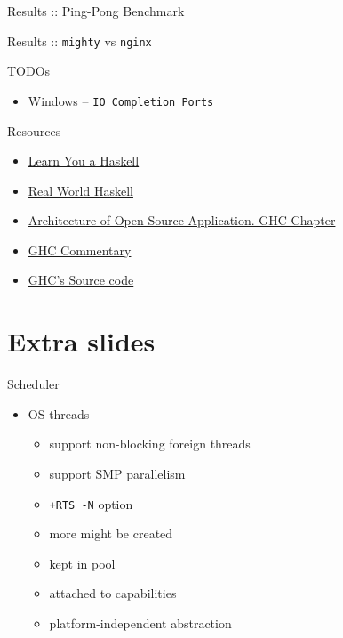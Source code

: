 \documentclass{beamer}
\begin{document}
\begin{frame}{Results :: Ping-Pong Benchmark}
  \centering
\end{frame}

\begin{frame}{Results :: \texttt{mighty} vs \texttt{nginx}}
  \centering
\end{frame}

\begin{frame}{TODOs}
  \begin{itemize}
    \item Windows \pause -- \texttt{IO Completion Ports}
  \end{itemize}
\end{frame}

\begin{frame}{Resources}
  \begin{itemize}
    \item \href{http://learnyouahaskell.com/}{Learn You a Haskell}
    \item \href{http://book.realworldhaskell.org/read/}{Real World Haskell}
    \item \href{http://www.aosabook.org/en/ghc.html}{Architecture of Open Source Application. GHC Chapter}
    \item \href{http://hackage.haskell.org/trac/ghc/wiki/Commentary}{GHC Commentary}
    \item \href{https://github.com/ghc/ghc}{GHC's Source code}
  \end{itemize}
\end{frame}

\section{Extra slides}
\frame{\tableofcontents[currentsection]}

\begin{frame}{Scheduler}
  \begin{itemize}
    \item OS threads
    \begin{itemize}
      \item support non-blocking foreign threads
      \item support SMP parallelism
      \pause
      \item \texttt{+RTS -N} option
      \item more might be created
      \item kept in pool
      \item attached to capabilities
      \item platform-independent abstraction
    \end{itemize}
  \end{itemize}
\end{frame}
\end{document}
